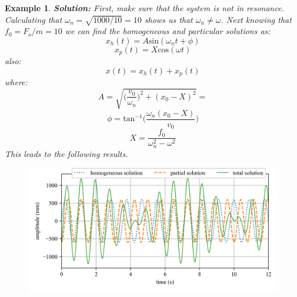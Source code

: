 \documentclass[12pt,letter]{article}
\newtheorem{ex}{Example}
\numberwithin{ex}{section} %
\newenvironment{example}{\begin{mdframed}[middlelinewidth=0.5mm]\begin{ex}\normalfont}{\end{ex}\end{mdframed}}
\numberwithin{re}{section} %
\begin{document}
\begin{example}
			\noindent\textbf{Solution:} First, make sure that the system is not in resonance. Calculating that $\omega_n = \sqrt{1000/10} = 10$ shows us that $\omega_n \neq \omega$. Next knowing that $f_0 = F_o/m = 10$ we can find the homogeneous and particular solutions as:
			\begin{equation}
				x_h(t) = A\text{sin}(\omega_n t + \phi)
			\end{equation}				
			\begin{equation}
				x_p(t) = X\text{cos}(\omega t) 
			\end{equation}	
			also:			
			\begin{equation}
				x(t) = x_h(t) + x_p(t)
			\end{equation}	
			where:			
			\begin{equation}
				A = \sqrt{\bigg(\frac{v_0}{\omega_n}\bigg)^2+(x_0-X)^2} = 
			\end{equation}				
			\begin{equation}
				\phi = \text{tan}^{-1}\bigg(\frac{\omega_n(x_0-X)}{v_0}\bigg)
			\end{equation}				
			\begin{equation}
				X = \frac{f_0}{\omega_n^2-\omega^2}
			\end{equation}			
			This leads to the following results. 
			\begin{figure}[H]
				\centering
				\includegraphics[]{../Figures/homogeneous_and_particular_solutions.png}
			\end{figure}			

\end{example}
\end{document}
